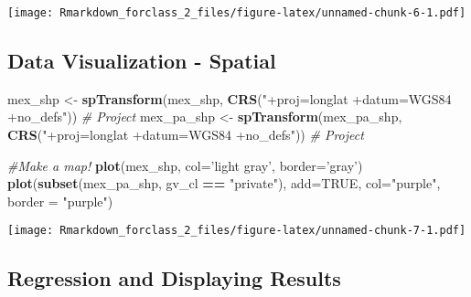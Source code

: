 \documentclass[
]{article}
\newenvironment{Shaded}{\begin{snugshade}}{\end{snugshade}}
\newcommand{\CommentTok}[1]{\textcolor[rgb]{0.56,0.35,0.01}{\textit{#1}}}
\newcommand{\DataTypeTok}[1]{\textcolor[rgb]{0.13,0.29,0.53}{#1}}
\newcommand{\KeywordTok}[1]{\textcolor[rgb]{0.13,0.29,0.53}{\textbf{#1}}}
\newcommand{\NormalTok}[1]{#1}
\newcommand{\OperatorTok}[1]{\textcolor[rgb]{0.81,0.36,0.00}{\textbf{#1}}}
\newcommand{\OtherTok}[1]{\textcolor[rgb]{0.56,0.35,0.01}{#1}}
\newcommand{\StringTok}[1]{\textcolor[rgb]{0.31,0.60,0.02}{#1}}
\begin{document}
\texttt{[image: Rmarkdown\_forclass\_2\_files/figure-latex/unnamed-chunk-6-1.pdf]}

\hypertarget{data-visualization---spatial}{%
\subsection{Data Visualization -
Spatial}\label{data-visualization---spatial}}

\begin{Shaded}
\begin{Highlighting}[]
\NormalTok{mex_shp <-}\StringTok{ }\KeywordTok{spTransform}\NormalTok{(mex_shp, }\KeywordTok{CRS}\NormalTok{(}\StringTok{"+proj=longlat +datum=WGS84 +no_defs"}\NormalTok{)) }\CommentTok{# Project }
\NormalTok{mex_pa_shp <-}\StringTok{ }\KeywordTok{spTransform}\NormalTok{(mex_pa_shp, }\KeywordTok{CRS}\NormalTok{(}\StringTok{"+proj=longlat +datum=WGS84 +no_defs"}\NormalTok{)) }\CommentTok{# Project }

\CommentTok{#Make a map! }
\KeywordTok{plot}\NormalTok{(mex_shp, }\DataTypeTok{col=}\StringTok{'light gray'}\NormalTok{, }\DataTypeTok{border=}\StringTok{'gray'}\NormalTok{)}
\KeywordTok{plot}\NormalTok{(}\KeywordTok{subset}\NormalTok{(mex_pa_shp, gv_cl }\OperatorTok{==}\StringTok{ "private"}\NormalTok{), }\DataTypeTok{add=}\OtherTok{TRUE}\NormalTok{, }\DataTypeTok{col=}\StringTok{"purple"}\NormalTok{, }\DataTypeTok{border =} \StringTok{"purple"}\NormalTok{)}
\end{Highlighting}
\end{Shaded}

\texttt{[image: Rmarkdown\_forclass\_2\_files/figure-latex/unnamed-chunk-7-1.pdf]}

\hypertarget{regression-and-displaying-results}{%
\subsection{Regression and Displaying
Results}\label{regression-and-displaying-results}}
\end{document}
